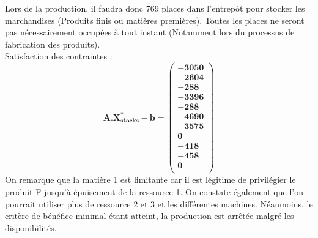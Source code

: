 \documentclass[12pt]{article}
\begin{document}
Lors de la production, il faudra donc 769 places dans l'entrepôt pour stocker les marchandises (Produits finis ou matières premières). Toutes les places ne seront pas nécessairement occupées à tout instant (Notamment lors du processus de fabrication des produits).
\\
Satisfaction des contraintes : 
\begin{equation*}
\boldsymbol{A.X^{*}_{stocks} - b = 
   \left (
   \begin{aligned}
      -3050 \\
      -2604 \\
      -288 \\
      -3396\\
      -288 \\
      -4690 \\
      -3575 \\
      0\\
      -418 \\
      -458\\
      0\\
   \end{aligned}
   \right )
 } 
\end{equation*}
On remarque que la matière 1 est limitante car il est légitime de privilégier le produit F jusqu'à épuisement de la ressource 1.
On constate également que l'on pourrait utiliser plus de ressource 2 et 3 et les différentes machines. Néanmoins, le critère de bénéfice minimal étant atteint, la production est arrêtée malgré les disponibilités.
\end{document}
